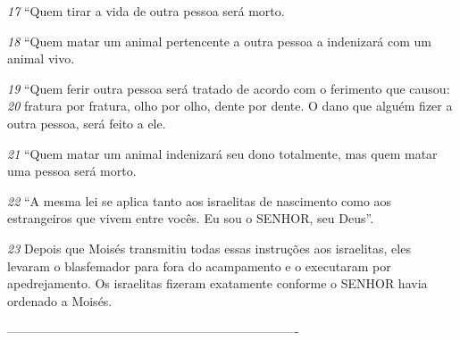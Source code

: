 \textit{\tiny 17}
“Quem tirar a vida de outra pessoa será morto.
   
\textit{\tiny 18}
“Quem matar um animal pertencente a outra pessoa a indenizará com um
animal vivo.
   
\textit{\tiny 19}
“Quem ferir outra pessoa será tratado de acordo com o ferimento que
causou: 
\textit{\tiny 20}
fratura por fratura, olho por olho, dente por dente. O dano que alguém
fizer a outra pessoa, será feito a ele.
   
\textit{\tiny 21}
“Quem matar um animal indenizará seu dono totalmente, mas quem matar
uma pessoa será morto.
   
\textit{\tiny 22}
“A mesma lei se aplica tanto aos israelitas de nascimento como aos
estrangeiros que vivem entre vocês. Eu sou o SENHOR, seu Deus”.
   
\textit{\tiny 23}
Depois que Moisés transmitiu todas essas instruções aos israelitas, eles
levaram o blasfemador para fora do acampamento e o executaram por
apedrejamento. Os israelitas fizeram exatamente conforme o SENHOR havia
ordenado a Moisés.

----------------------------------------------------------------------
